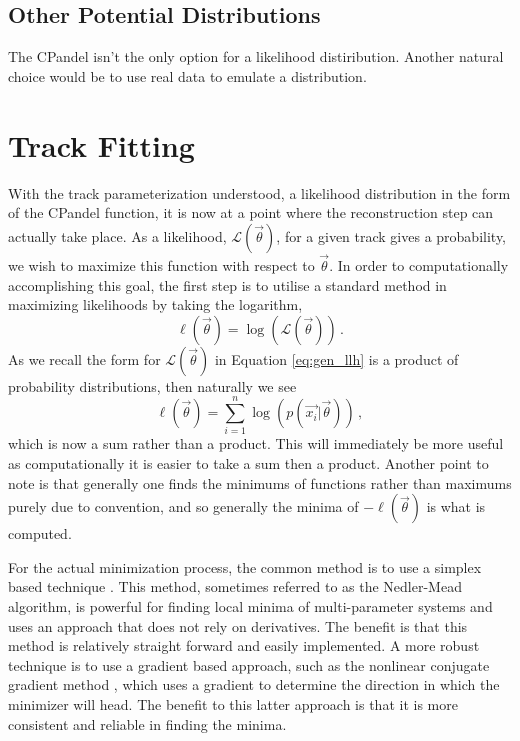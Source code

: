 \subsection{Other Potential Distributions}

The CPandel isn't the only option for a likelihood distiribution. Another natural choice would be to use real data to emulate a distribution.

\section{Track Fitting}

With the track parameterization understood, a likelihood distribution in the form of the CPandel function, it is now at a point where the reconstruction step can actually take place. As a likelihood, $\mathcal{L}(\vec{\theta})$, for a given track gives a probability, we wish to maximize this function with respect to $\vec{\theta}$. In order to computationally accomplishing this goal, the first step is to utilise a standard method in maximizing likelihoods by taking the logarithm,
\begin{equation}  
  \ell(\vec{\theta}) = \log\left(\mathcal{L}(\vec{\theta})\right)\, .
\end{equation}
As we recall the form for $\mathcal{L}(\vec{\theta})$ in Equation \ref{eq:gen_llh} is a product of probability distributions, then naturally we see
\begin{equation}
  \ell(\vec{\theta}) = \sum_{i=1}^{n}\log\left(p\left(\vec{x_{i}}\bigr\rvert\vec{\theta}\right)\right)\, ,
\end{equation}
which is now a sum rather than a product. This will immediately be more useful as computationally it is easier to take a sum then a product. Another point to note is that generally one finds the minimums of functions rather than maximums purely due to convention, and so generally the minima of $-\ell(\vec{\theta})$ is what is computed.

For the actual minimization process, the common method is to use a simplex based technique \cite{simplex}. This method, sometimes referred to as the Nedler-Mead algorithm, is powerful for finding local minima of multi-parameter systems and uses an approach that does not rely on derivatives. The benefit is that this method is relatively straight forward and easily implemented. A more robust technique is to use a gradient based approach, such as the nonlinear conjugate gradient method \cite{gradient}, which uses a gradient to determine the direction in which the minimizer will head. The benefit to this latter approach is that it is more consistent and reliable in finding the minima.

